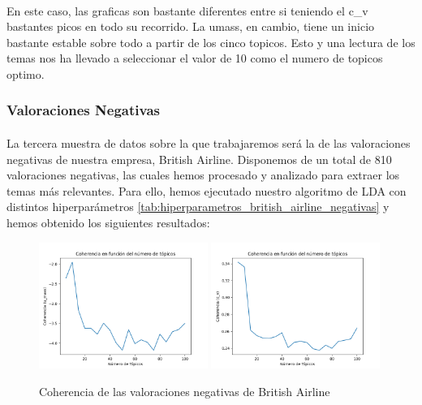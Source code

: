 \documentclass{report}
\begin{document}
{                    \paragraph*{}{
                        En este caso, las graficas son bastante diferentes entre si teniendo el c\_v bastantes picos en todo su recorrido.
                        La umass, en cambio, tiene un inicio bastante estable sobre todo a partir de los cinco topicos.
                        Esto y una lectura de los temas nos ha llevado a seleccionar el valor de 10 como el numero de topicos optimo.
                    }
                \clearpage\subsubsection*{Valoraciones Negativas}
                    \paragraph*{}{
                        La tercera muestra de datos sobre la que trabajaremos será la de las valoraciones negativas de nuestra empresa, British Airline.
                        Disponemos de un total de 810 valoraciones negativas, las cuales hemos procesado y analizado para extraer los temas más relevantes.
                        Para ello, hemos ejecutado nuestro algoritmo de LDA con distintos hiperparámetros \ref{tab:hiperparametros_british_airline_negativas} y hemos obtenido los siguientes resultados:
                    }
                    \begin{figure}[H]
                        \centering
                        \includegraphics[width=0.49\textwidth]{./img/british_airline_negativas_umass.png}
                        \includegraphics[width=0.49\textwidth]{./img/british_airline_negativas_cv.png}
                        \caption{Coherencia de las valoraciones negativas de British Airline}
                    \end{figure}
}
\end{document}
